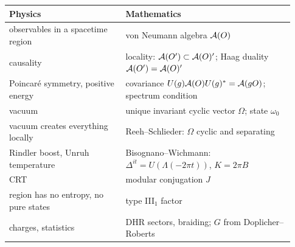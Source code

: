 \begin{dictbox}
\renewcommand{\arraystretch}{1.3}
\begin{tabular}{@{}p{0.38\linewidth}p{0.55\linewidth}@{}}
\textbf{Physics} & \textbf{Mathematics}\\
\hline
observables in a spacetime region & von Neumann algebra $\mathcal{A}(O)$\\
causality & locality: $\mathcal{A}(O')\subset\mathcal{A}(O)'$; Haag duality $\mathcal{A}(O')=\mathcal{A}(O)'$\\
Poincar\'e symmetry, positive energy & covariance $U(g)\mathcal{A}(O)U(g)^{*}=\mathcal{A}(gO)$; spectrum condition\\
vacuum & unique invariant cyclic vector $\Omega$; state $\omega_0$\\
vacuum creates everything locally & Reeh--Schlieder: $\Omega$ cyclic and separating\\
Rindler boost, Unruh temperature & Bisognano--Wichmann: $\Delta^{it}=U(\Lambda(-2\pi t))$, $K=2\pi B$\\
CRT & modular conjugation $J$\\
region has no entropy, no pure states & type III$_1$ factor\\
charges, statistics & DHR sectors, braiding; $G$ from Doplicher--Roberts\\
\end{tabular}
\end{dictbox}
